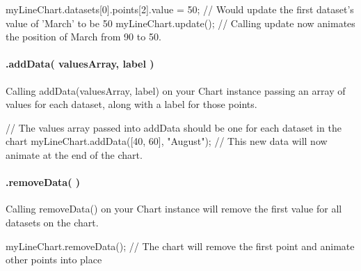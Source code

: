 \begin{DoxyCode}
myLineChart.datasets[0].points[2].value = 50;
// Would update the first dataset's value of 'March' to be 50
myLineChart.update();
// Calling update now animates the position of March from 90 to 50.
\end{DoxyCode}


\paragraph*{.add\+Data( values\+Array, label )}

Calling {\ttfamily add\+Data(values\+Array, label)} on your Chart instance passing an array of values for each dataset, along with a label for those points.


\begin{DoxyCode}
// The values array passed into addData should be one for each dataset in the chart
myLineChart.addData([40, 60], "August");
// This new data will now animate at the end of the chart.
\end{DoxyCode}


\paragraph*{.remove\+Data( )}

Calling {\ttfamily remove\+Data()} on your Chart instance will remove the first value for all datasets on the chart.


\begin{DoxyCode}
myLineChart.removeData();
// The chart will remove the first point and animate other points into place
\end{DoxyCode}
 